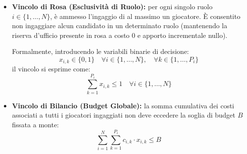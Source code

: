\documentclass{cisXXX} %
\begin{document}
    \begin{itemize}                                                                                                                           
        \item \textbf{Vincolo di Rosa (Esclusività di Ruolo):} per ogni singolo ruolo $i \in \{1, \dots, N\}$, è ammesso l'ingaggio di al     
  massimo un giocatore. È consentito non ingaggiare alcun candidato in un determinato ruolo (mantenendo la riserva d'ufficio presente in rosa 
  a costo $0$ e apporto incrementale nullo).                                                                                                  
                                                                                                                                              
        Formalmente, introducendo le variabili binarie di decisione:                                                                          
        \[                                                                                                                                    
        x_{i,k} \in \{0, 1\} \quad \forall i \in \{1, \dots, N\}, \quad \forall k \in \{1, \dots, P_i\}                                       
        \]                                                                                                                                    
        il vincolo si esprime come:                                                                                                           
        \[                                                                                                                                    
        \sum_{k=1}^{P_i} x_{i,k} \le 1 \quad \forall i \in \{1, \dots, N\}                                                                    
        \]                                                                                                                                    
                                                                                                                                              
        \item \textbf{Vincolo di Bilancio (Budget Globale):} la somma cumulativa dei costi associati a tutti i giocatori ingaggiati non deve  
  eccedere la soglia di budget $B$ fissata a monte:                                                                                           
        \[                                                                                                                                    
        \sum_{i=1}^N \sum_{k=1}^{P_i} c_{i,k} \cdot x_{i,k} \le B                                                                             
        \]                                                                                                                                    
    \end{itemize}                                                                                                                             
                                                                                                                                              
\end{document}
